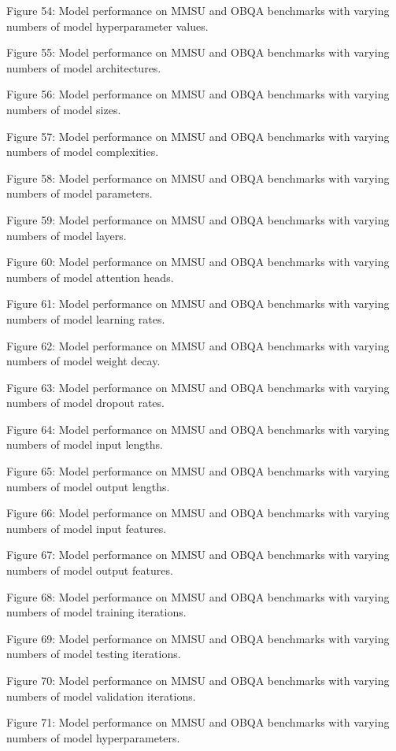         Figure 54: Model performance on MMSU and OBQA benchmarks with varying numbers of model hyperparameter values.

        Figure 55: Model performance on MMSU and OBQA benchmarks with varying numbers of model architectures.

        Figure 56: Model performance on MMSU and OBQA benchmarks with varying numbers of model sizes.

        Figure 57: Model performance on MMSU and OBQA benchmarks with varying numbers of model complexities.

        Figure 58: Model performance on MMSU and OBQA benchmarks with varying numbers of model parameters.

        Figure 59: Model performance on MMSU and OBQA benchmarks with varying numbers of model layers.

        Figure 60: Model performance on MMSU and OBQA benchmarks with varying numbers of model attention heads.

        Figure 61: Model performance on MMSU and OBQA benchmarks with varying numbers of model learning rates.

        Figure 62: Model performance on MMSU and OBQA benchmarks with varying numbers of model weight decay.

        Figure 63: Model performance on MMSU and OBQA benchmarks with varying numbers of model dropout rates.

        Figure 64: Model performance on MMSU and OBQA benchmarks with varying numbers of model input lengths.

        Figure 65: Model performance on MMSU and OBQA benchmarks with varying numbers of model output lengths.

        Figure 66: Model performance on MMSU and OBQA benchmarks with varying numbers of model input features.

        Figure 67: Model performance on MMSU and OBQA benchmarks with varying numbers of model output features.

        Figure 68: Model performance on MMSU and OBQA benchmarks with varying numbers of model training iterations.

        Figure 69: Model performance on MMSU and OBQA benchmarks with varying numbers of model testing iterations.

        Figure 70: Model performance on MMSU and OBQA benchmarks with varying numbers of model validation iterations.

        Figure 71: Model performance on MMSU and OBQA benchmarks with varying numbers of model hyperparameters.

